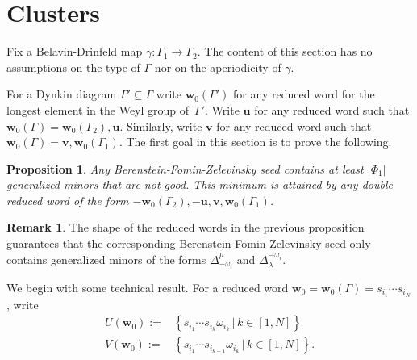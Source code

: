 \documentclass[a4paper]{amsart}
\newtheorem{proposition}[theorem]{Proposition}
\theoremstyle{definition}
\newtheorem{remark}[theorem]{Remark}
\newcommand{\bfu}{\mathbf{u}}
\newcommand{\bfv}{\mathbf{v}}
\newcommand{\bfw}{\mathbf{w}}
\begin{document}
\section{Clusters}
Fix a Belavin-Drinfeld map $\gamma:\Gamma_1\rightarrow\Gamma_2$.
The content of this section has no assumptions on the type of $\Gamma$ nor on the aperiodicity of $\gamma$.

For a Dynkin diagram $\Gamma'\subseteq\Gamma$ write $\bfw_0(\Gamma')$ for any reduced word for the longest element in the Weyl group of~$\Gamma'$.
Write $\bfu$ for any reduced word such that $\bfw_0(\Gamma) = \bfw_0(\Gamma_2), \bfu$.
Similarly, write $\bfv$ for any reduced word such that $\bfw_0(\Gamma) = \bfv, \bfw_0(\Gamma_1)$.
The first goal in this section is to prove the following.
\begin{proposition}
  \label{prop: max compatible}
  Any Berenstein-Fomin-Zelevinsky seed contains at least $|\Phi_1|$ generalized minors that are not good.
  This minimum is attained by any double reduced word of the form $-\bfw_0(\Gamma_2), -\bfu, \bfv, \bfw_0(\Gamma_1)$.
\end{proposition}

\begin{remark}
  The shape of the reduced words in the previous proposition guarantees that the corresponding Berenstein-Fomin-Zelevinsky seed only contains generalized minors of the forms $\Delta_{-\omega_i}^\mu$ and $\Delta_\lambda^{-\omega_i}$.
\end{remark}

We begin with some technical result.
For a reduced word $\bfw_0=\bfw_0(\Gamma)=s_{i_1}\cdots s_{i_N}$, write
\begin{align*}
  U(\bfw_0):=&\left\{s_{i_1}\cdots s_{i_k}\omega_{i_k} \,|\, k\in[1,N]\right\}\\
  V(\bfw_0):=&\left\{s_{i_1}\cdots s_{i_{k-1}}\omega_{i_k} \,|\, k\in[1,N]\right\}.
\end{align*}
\end{document}
